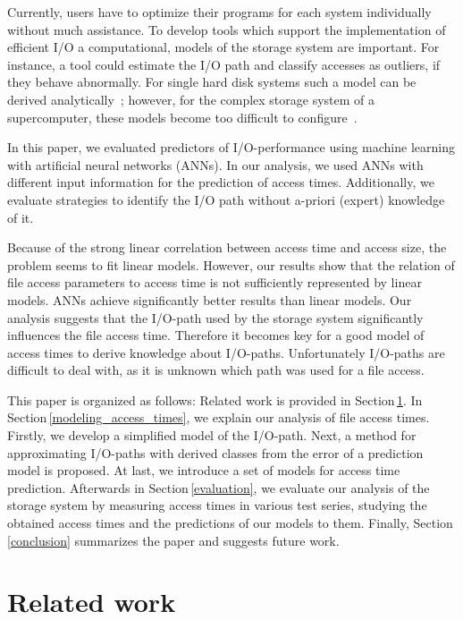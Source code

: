 \documentclass{superfri}
\begin{document}
Currently, users have to optimize their programs for each system individually without much assistance.
To develop tools which support the implementation of efficient I/O a computational, models of the storage system are important.
For instance, a tool could estimate the I/O path and classify accesses as outliers, if they behave abnormally.
For single hard disk systems such a model can be derived analytically~\cite{Ruemmler94anintroduction}; however, for the complex storage system of a supercomputer, these models become too difficult to configure~\cite{DBLP:conf/npc/ZhangLZJC10}.

In this paper, we evaluated predictors of I/O-performance using machine learning with artificial neural networks (ANNs).
In our analysis, we used ANNs with different input information for the prediction of access times.
Additionally, we evaluate strategies to identify the I/O path without a-priori (expert) knowledge of it.

Because of the strong linear correlation between access time and access size, the problem seems to fit linear models.
However, our results show that the relation of file access parameters to access time is not sufficiently represented by linear models.
ANNs achieve significantly better results than linear models.
Our analysis suggests that the I/O-path used by the storage system significantly influences the file access time.
Therefore it becomes key for a good model of access times to derive knowledge about I/O-paths.
Unfortunately I/O-paths are difficult to deal with, as it is unknown which path was used for a file access.

This paper is organized as follows:
Related work is provided in Section\,\ref{sec:related}.
In Section\,\ref{modeling_access_times}, we explain our analysis of file access times. 
Firstly, we develop a simplified model of the I/O-path. 
Next, a method for approximating I/O-paths with derived classes from the error of a prediction model is proposed. 
At last, we introduce a set of models for access time prediction.
Afterwards in Section\,\ref{evaluation}, we evaluate our analysis of the storage system by measuring access times in various test series, studying the obtained access times and the predictions of our models to them.
Finally, Section\,\ref{conclusion} summarizes the paper and suggests future work.

\section{Related work}
\label{sec:related}
\end{document}

